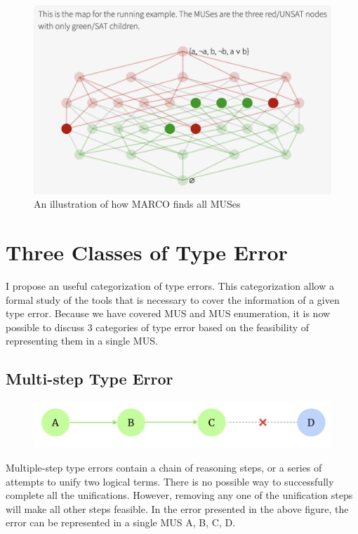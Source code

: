 \begin{figure}[hbt]
  \includegraphics[width=\linewidth]{MarcoViz}
  \caption{An illustration of how MARCO finds all MUSes}
\end{figure}
  

\section{Three Classes of Type Error}

I propose an useful categorization of type errors. This categorization allow a formal study of the tools that is necessary to cover the information of a given type error.  Because we have covered MUS and MUS enumeration, it is now possible to discuss 3 categories of type error based on the feasibility of representing them in a single MUS.

\subsection{Multi-step Type Error}
\begin{figure}[hbt]
  \includegraphics[width=0.5\linewidth]{Multi-step}
  \caption{}
\end{figure}

Multiple-step type errors contain a chain of reasoning steps, or a series of attempts to unify two logical terms. There is no possible way to successfully complete all the unifications. However, removing any one of the unification steps will make all other steps feasible. In the error presented in the above figure, the error can be represented in a single MUS {A, B, C, D}.

